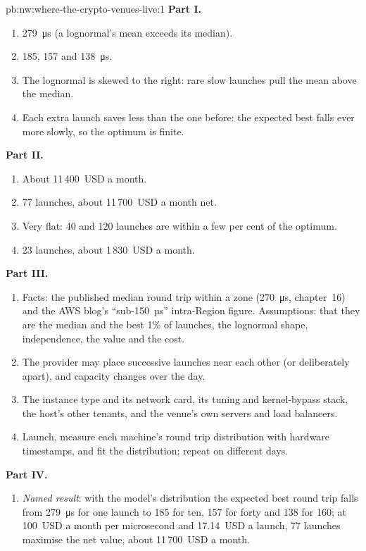 \begin{solution}{pb:nw:where-the-crypto-venues-live:1}
\textbf{Part I.}
\begin{enumerate}
\item \qty{279}{\micro\second} (a lognormal's mean exceeds its median).
\item 185, 157 and \qty{138}{\micro\second}.
\item The lognormal is skewed to the right: rare slow launches pull the mean above the median.
\item Each extra launch saves less than the one before: the expected best falls ever more slowly, so the optimum is finite.
\end{enumerate}
\textbf{Part II.}
\begin{enumerate}[resume]
\item About 11\,400~USD a month.
\item 77 launches, about 11\,700~USD a month net.
\item Very flat: 40 and 120 launches are within a few per cent of the optimum.
\item 23 launches, about 1\,830~USD a month.
\end{enumerate}
\textbf{Part III.}
\begin{enumerate}[resume]
\item Facts: the published median round trip within a zone (\qty{270}{\micro\second}, chapter~16) and the AWS blog's ``sub-150~µs'' intra-Region figure.
  Assumptions: that they are the median and the best 1\% of launches, the lognormal shape, independence, the value and the cost.
\item The provider may place successive launches near each other (or deliberately apart), and capacity changes over the day.
\item The instance type and its network card, its tuning and kernel-bypass stack, the host's other tenants, and the venue's own servers and load
  balancers.
\item Launch, measure each machine's round trip distribution with hardware timestamps, and fit the distribution; repeat on different days.
\end{enumerate}
\textbf{Part IV.}
\begin{enumerate}[resume]
\item \emph{Named result}: with the model's distribution the expected best round trip falls from \qty{279}{\micro\second} for one launch to 185 for ten,
  157 for forty and 138 for 160; at 100~USD a month per microsecond and 17.14~USD a launch, 77 launches maximise the net value, about 11\,700~USD a month.

\end{enumerate}
\end{solution}
